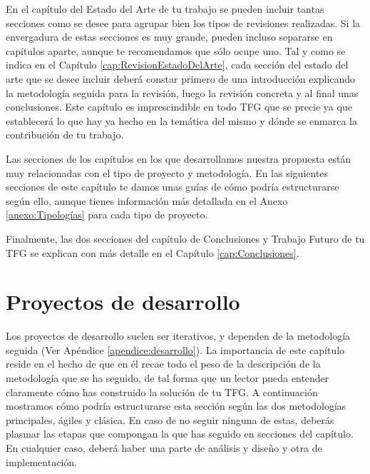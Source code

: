 En el capítulo del Estado del Arte de tu trabajo se pueden incluir tantas secciones como se desee para agrupar bien los tipos de revisiones realizadas. Si la envergadura de estas secciones es muy grande, pueden incluso separarse en capítulos aparte, aunque te recomendamos que sólo ocupe uno. Tal y como se indica en el Capítulo \ref{cap:RevisionEstadoDelArte}, cada sección del estado del arte que se desee incluir deberá constar primero de una introducción explicando la metodología seguida para la revisión, luego la revisión concreta y al final unas conclusiones. Este capítulo es imprescindible en todo TFG que se precie ya que establecerá lo que hay ya hecho en la temática del mismo y dónde se enmarca la contribución de tu trabajo.


Las secciones de los capítulos en los que desarrollamos nuestra propuesta están muy relacionadas con el tipo de proyecto y metodología. En las siguientes secciones de este capítulo te damos unas guías de cómo podría estructurarse según ello, aunque tienes información más detallada en el Anexo \ref{anexo:Tipologías} para cada tipo de proyecto.

Finalmente, las dos secciones del capítulo de Conclusiones y Trabajo Futuro de tu TFG se explican con más detalle en el Capítulo \ref{cap:Conclusiones}.

\section{Proyectos de desarrollo}

Los proyectos de desarrollo suelen ser iterativos, y dependen de la metodología seguida (Ver Apéndice \ref{apendice:desarrollo}). La importancia de este capítulo reside en el hecho de que en él recae todo el peso de la descripción de la metodología que se ha seguido, de tal forma que un lector pueda entender claramente cómo has construido la solución de tu TFG. A continuación mostramos cómo podría estructurarse esta sección según las dos  metodologías principales, ágiles y clásica. En caso de no seguir ninguna de estas, deberás plasmar las etapas que compongan la que has seguido en secciones del capítulo. En cualquier caso, deberá haber una parte de análisis y diseño y otra de implementación.

